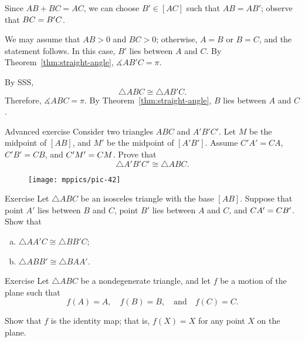 Since $AB+BC=AC$, we can choose $B'\in [AC]$ such that $AB=AB'$;
observe that $BC=B'C$.

We may assume that $AB>0$ and $BC>0$;
otherwise, $A=B$ or $B=C$, and the statement follows.
In this case, $B'$ lies between $A$ and $C$.
By Theorem~\ref{thm:straight-angle}, $\measuredangle AB'C=\pi$.

By SSS, 
\[\triangle ABC\cong \triangle AB'C.\]
Therefore, $\measuredangle ABC=\pi$.
By Theorem~\ref{thm:straight-angle}, $B$ lies between $A$ and $C$.
\qeds



\begin{thm}{Advanced exercise}\label{ex:SMS}
Consider two triangles $A B C$ and $A' B' C'$.
Let $M$ be the midpoint of $[A B]$, and
$M'$ be the midpoint of $[A' B']$.
Assume $C' A'=C A$, $C' B'= C B$, and $C' M'= C M$.
Prove that
\[\triangle A' B' C'\cong\triangle A B C.\]

\end{thm}

{

\begin{wrapfigure}[6]{r}{26mm}
\vskip-0mm
\centering
\texttt{[image: mppics/pic-42]}
\end{wrapfigure}

\begin{thm}{Exercise}\label{ex:isos-sides}
Let $\triangle A B C$ be an isosceles triangle with the base $[A B]$.
Suppose that point $A'$ lies between $B$ and $C$,
point $B'$ lies between $A$ and $C$,
and $C A'=C B'$.
Show that
\begin{enumerate}[(a)]
\item $\triangle A A' C\cong \triangle B B' C$;
\item $\triangle A B B'\cong \triangle B A A'$.
\end{enumerate}

\end{thm}

\begin{thm}{Exercise}\label{ex:ABC-motion}
Let $\triangle ABC$ be a nondegenerate triangle, and
let $f$ be a motion of the plane 
such that 
$$f(A)=A,
\quad 
f(B)=B,
\quad 
\text{and}
\quad
f(C)=C.$$

Show that $f$ is the identity map;
that is, $f(X)=X$ for any point $X$ on the plane.
\end{thm}

}



